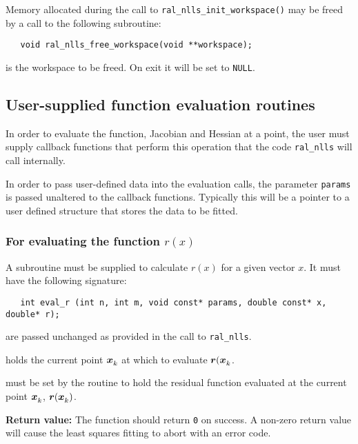 \documentclass{spec}
\begin{document}
Memory allocated during the call to \texttt{ral\_nlls\_init\_workspace()} may be freed
by a call to the following subroutine:
\begin{verbatim}
   void ral_nlls_free_workspace(void **workspace);
\end{verbatim}

\begin{description}
    is the workspace to be freed. On exit it will be set to \texttt{NULL}.
\end{description}


\subsection{User-supplied function evaluation routines}
\label{sec::function_eval}
In order to evaluate the function, Jacobian and Hessian at a point, the user
must supply callback functions that perform this operation that the code
{\tt ral\_nlls} will call internally.

In order to pass user-defined data into the evaluation calls, the parameter
\texttt{params} is passed unaltered to the callback functions. Typically this
will be a pointer to a user defined structure that stores the data to be fitted.

\subsubsection{For evaluating the function $r(x)$}
A subroutine must be supplied to calculate $r(x)$ for a given vector $x$. It
must have the following signature:

\begin{verbatim}
   int eval_r (int n, int m, void const* params, double const* x, double* r);
\end{verbatim}

\begin{description}
    are passed unchanged as provided in the call to
      {\tt ral\_nlls}.

    holds the current point ${\bm x}_{k}^{}$ at which to evaluate ${\bm r}({\bm x}_{k}^{}$.

    must be set by the routine to hold the residual function
      evaluated at the current point ${\bm x}_{k}^{}$, ${\bm r}({\bm x}_{k}^{})$.
\end{description}
\textbf{Return value:} The function should return \texttt{0} on success. A
non-zero return value will cause the least squares fitting to abort with an
error code.
\end{document}

